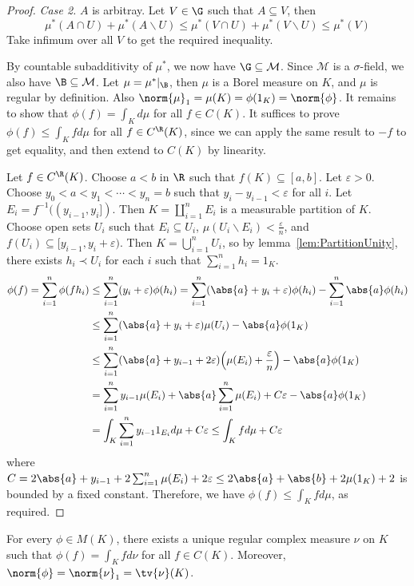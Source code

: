 \documentclass[a4paper]{article}
\begin{document}
\begin{proof}
	\emph{Case 2.} $A$ is arbitray. Let $V\in\G$ such that $A\subseteq V$, then
	\[
	 \mu^*(A\cap U)+\mu^*(A\backslash U)\leq\mu^*(V\cap U)+\mu^*(V\backslash U)\leq\mu^*(V)
	\]
	Take infimum over all $V$ to get the required inequality.

	By countable subadditivity of $\mu^*$, we now have $\G\subseteq\mathcal{M}$. Since $\mathcal{M}$ is a $\sigma$-field, we also have $\B\subseteq\mathcal{M}$. Let $\mu=\mu^*|_\B$, then $\mu$ is a Borel measure on $K$, and $\mu$ is regular by definition. Also $\norm{\mu}_1=\mu(K)=\phi(1_K)=\norm{\phi}$. It remains to show that $\phi(f)=\int_K d\mu$ for all $f\in C(K)$. It suffices to prove $\phi(f)\leq\int_K f d\mu$ for all $f\in C^\R(K)$, since we can apply the same result to $-f$ to get equality, and then extend to $C(K)$ by linearity.

	Let $f\in C^\R(K)$. Choose $a<b$ in $\R$ such that $f(K)\subseteq[a,b]$. Let $\varepsilon>0$. Choose $y_0<a<y_1<\cdots<y_n=b$ such that $y_i-y_{i-1}<\varepsilon$ for all $i$. Let $E_i=f^{-1}((y_{i-1},y_i])$. Then $K=\coprod_{i=1}^n E_i$ is a measurable partition of $K$. Choose open sets $U_i$ such that $E_i\subseteq U_i$, $\mu(U_i\backslash E_i)<\frac{\varepsilon}{n}$, and $f(U_i)\subseteq[y_{i-1},y_i+\varepsilon)$. Then $K=\bigcup_{i=1}^n U_i$, so by lemma~\ref{lem:PartitionUnity}, there exists $h_i\prec U_i$ for each $i$ such that $\sum_{i=1}^n h_i=1_K$.
	\begin{align*}
		\phi(f)=\sum_{i=1}^n \phi(fh_i)&\leq\sum_{i=1}^n(y_i+\varepsilon)\phi(h_i)= \sum_{i=1}^n(\abs{a}+y_i+\varepsilon)\phi(h_i)- \sum_{i=1}^n\abs{a}\phi(h_i)\\
		&\leq \sum_{i=1}^n(\abs{a}+y_i+\varepsilon)\mu(U_i)-\abs{a}\phi(1_K)\\
		&\leq\sum_{i=1}^n(\abs{a}+y_{i-1}+2\varepsilon)\Big(\mu(E_i)+\frac{\varepsilon}{n}\Big)-\abs{a}\phi(1_K)\\
		&=\sum_{i=1}^n y_{i-1}\mu(E_i)+ \abs{a}\sum_{i=1}^n\mu(E_i)+ C\varepsilon- \abs{a}\phi(1_K)\\
		&=\int_K\sum_{i=1}^n y_{i-1}1_{E_i}d\mu+C\varepsilon\leq\int_K fd\mu+C\varepsilon
	\end{align*}
	where $C=2\abs{a}+y_{i-1}+2\sum_{i=1}^n\mu(E_i)+2\varepsilon\leq 2\abs{a}+\abs{b}+2\mu(1_K)+2$ is bounded by a fixed constant. Therefore, we have $\phi(f)\leq\int_K fd\mu$, as required.
\end{proof}

\begin{ncor}\label{cor:RieszRepComplex}
  For every $\phi\in M(K)$, there exists a unique regular complex measure $\nu$ on $K$ such that $\phi(f)=\int_K fd\nu$ for all $f\in C(K)$. Moreover, $\norm{\phi}=\norm{\nu}_1=\tv{\nu}(K)$.
\end{ncor}
\end{document}
